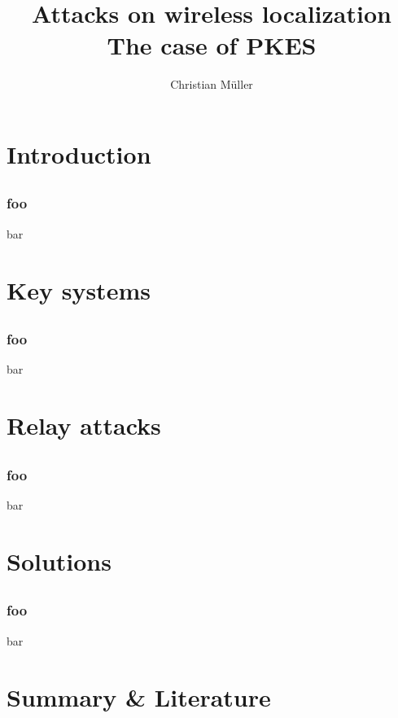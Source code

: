 \documentclass[12pt]{beamer}
\title{Attacks on wireless localization\\The case of PKES}
\author{Christian Müller}
\begin{document}
\begin{frame}
	\titlepage
\end{frame}

\begin{frame}
	\tableofcontents
\end{frame}

\section{Introduction}
\subsection*{}
	\begin{frame}
		\frametitle{foo}
		bar
	\end{frame}

\section{Key systems}
\subsection*{}
	\begin{frame}
		\frametitle{foo}
		bar
	\end{frame}

\section{Relay attacks}
\subsection*{}
	\begin{frame}
		\frametitle{foo}
		bar
	\end{frame}

\section{Solutions}
\subsection*{}
	\begin{frame}
		\frametitle{foo}
		bar
	\end{frame}

\section{Summary \& Literature}
\end{document}

